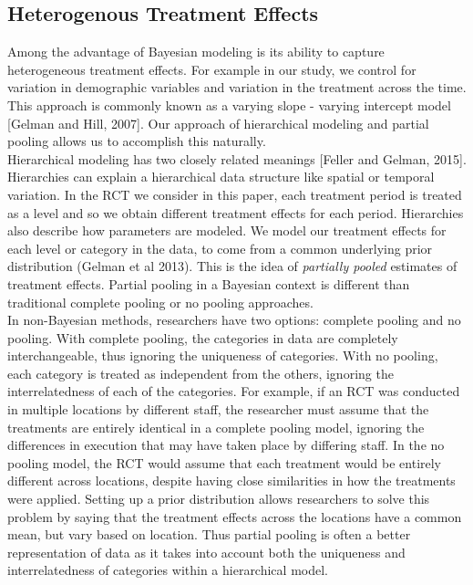 \documentclass{article}
\begin{document}
\subsection{Heterogenous Treatment Effects}
Among the advantage of Bayesian modeling is its ability to capture heterogeneous treatment effects. For example in our study, we control for variation in demographic variables and variation in the treatment across the time. This approach is commonly known as a varying slope - varying intercept model [Gelman and Hill, 2007]. Our approach of hierarchical modeling and partial pooling allows us to accomplish this naturally. \\
Hierarchical modeling has two closely related meanings [Feller and Gelman, 2015]. Hierarchies can explain a hierarchical data structure like spatial or temporal variation. In the RCT we consider in this paper, each treatment period is treated as a level and so we obtain different treatment effects for each period. Hierarchies also describe how parameters are modeled. We model our treatment effects for each level or category in the data, to come from a common underlying prior distribution (Gelman et al 2013). This is the idea of \textit{partially pooled} estimates of treatment effects. Partial pooling in a Bayesian context is different than traditional complete pooling or no pooling approaches. \\

In non-Bayesian methods, researchers have two options: complete pooling and no pooling. With complete pooling, the categories in data are completely interchangeable, thus ignoring the uniqueness of categories. With no pooling, each category is treated as independent from the others, ignoring the interrelatedness of each of the categories.  For example, if an RCT was conducted in multiple locations by different staff, the researcher must assume that the treatments are entirely identical in a complete pooling model, ignoring the differences in execution that may have taken place by differing staff. In the no pooling model, the RCT would assume that each treatment would be entirely different across locations, despite having close similarities in how the treatments were applied. Setting up a prior distribution allows researchers to solve this problem by saying that the treatment effects across the locations have a common mean, but vary based on location. Thus partial pooling is often a better representation of data as it takes into account both the uniqueness and interrelatedness of categories within a hierarchical model.
\end{document}
